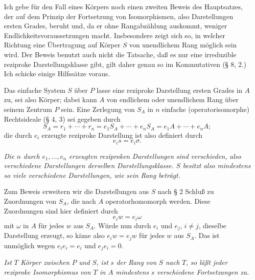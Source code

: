 \noindent\textbf{}
Ich gebe für den Fall eines Körpers noch einen zweiten Beweis des Hauptsatzes, der auf dem Prinzip der Fortsetzung von Isomorphismen, also Darstellungen ersten Grades, beruht und, da er ohne Rangabzählung auskommt, weniger Endlichkeitsvoraussetzungen macht. Insbesondere zeigt sich so, in welcher Richtung eine Übertragung auf Körper \(S\) von unendlichem Rang möglich sein wird. Der Beweis benutzt auch nicht die Tatsache, daß es nur eine irreduzible reziproke Darstellungsklasse gibt, gilt daher genau so im Kommutativen (§ 8, 2.) Ich schicke einige Hilfssätze voraus.

\noindent\textbf{} Das einfache System \(S\) über \(P\) lasse eine reziproke Darstellung ersten Grades in \(A\) zu, sei also Körper; dabei kann \(A\) von endlichem oder unendlichem Rang über seinem Zentrum \(P\) sein. Eine Zerlegung von \(S_A\) in \(n\) einfache (operatorisomorphe) Rechtsideale (§ 4, 3) sei gegeben durch
\[
        S_A=r_1+\cdots+r_n
            =e_1S_A+\cdots+e_nS_A
            =e_1A+\cdots+e_nA ;
\]
die durch \(e_i\) erzeugte reziproke Darstellung ist also definiert durch
\[
        e_i s=e_i\sigma .
\]

\noindent\textbf{} \emph{Die \(n\) durch \(e_1,\ldots,e_n\) erzeugten reziproken Darstellungen sind verschieden, also verschiedene Darstellungen derselben Darstellungsklasse. \(S\) besitzt also mindestens so viele verschiedene Darstellungen, wie sein Rang beträgt.}

Zum Beweis erweitern wir die Darstellungen aus \(S\) nach § 2 Schluß zu Zuordnungen von \(S_A\), die nach \(A\) operatorhomomorph werden. Diese Zuordnungen sind hier definiert durch
\[
        e_i w=e_i\omega
\]
mit \(\omega\) in \(A\) für jedes \(w\) aus \(S_A\). Würde nun durch \(e_i\) und \(e_j\), \(i\ne j\), dieselbe Darstellung erzeugt, so käme also \(e_iw=e_jw\) für jedes \(w\) aus \(S_A\). Das ist unmöglich wegen \(e_ie_i=e_i\) und \(e_je_i=0\).

\noindent\textbf{} \emph{Ist \(T\) Körper zwischen \(P\) und \(S\), ist \(s\) der Rang von \(S\) nach \(T\), so läßt jeder reziproke Isomorphismus von \(T\) in \(A\) mindestens \(s\) verschiedene Fortsetzungen zu.}

